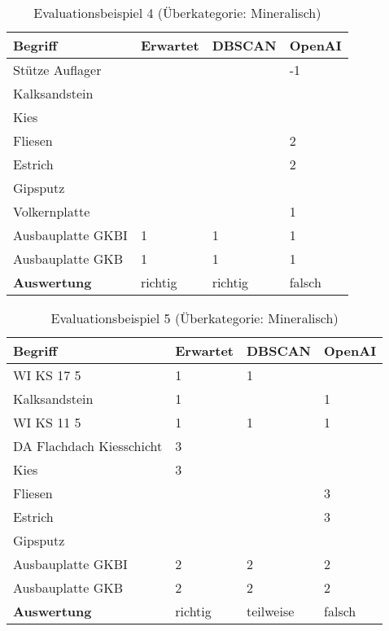 \begin{table}[h]
	
	\centering
	\begin{tabular}{|l|l|l|l|}
		\hline
		\textbf{Begriff} & \textbf{Erwartet} & \textbf{DBSCAN} & \textbf{OpenAI}\\ \hline
		 Stütze Auflager & ~ & ~ & -1 \\ \hline
		Kalksandstein & ~ & ~ & ~ \\ \hline
		Kies & ~ & ~ & ~ \\ \hline
		Fliesen & ~ & ~ & 2 \\ \hline
		Estrich & ~ & ~ & 2 \\ \hline
		Gipsputz & ~ & ~ & ~ \\ \hline
		Volkernplatte & ~ & ~ & 1 \\ \hline
		Ausbauplatte GKBI & 1 & 1 & 1 \\ \hline
		Ausbauplatte GKB & 1 & 1 & 1 \\ \hline
		\textbf{Auswertung} & richtig & richtig & falsch \\ \hline
	\end{tabular}
	\caption{Evaluationsbeispiel 4 (Überkategorie: Mineralisch)}
	\label{t:evaluation-example4}
\end{table}

\begin{table}[h]
	
	\centering
	\begin{tabular}{|l|l|l|l|}
		\hline
		\textbf{Begriff} & \textbf{Erwartet} & \textbf{DBSCAN} & \textbf{OpenAI}\\ \hline
		 WI KS 17 5 & 1 & 1 & ~ \\ \hline
		Kalksandstein & 1 & ~ & 1 \\ \hline
		WI KS 11 5 & 1 & 1 & 1 \\ \hline
		DA Flachdach Kiesschicht & 3 & ~ & ~ \\ \hline
		Kies & 3 & ~ & ~ \\ \hline
		Fliesen & ~ & ~ & 3 \\ \hline
		Estrich & ~ & ~ & 3 \\ \hline
		Gipsputz & ~ & ~ & ~ \\ \hline
		Ausbauplatte GKBI & 2 & 2 & 2 \\ \hline
		Ausbauplatte GKB & 2 & 2 & 2 \\ \hline
		\textbf{Auswertung} & richtig & teilweise & falsch \\ \hline
	\end{tabular}
	\caption{Evaluationsbeispiel 5 (Überkategorie: Mineralisch)}
	\label{t:evaluation-example5}
\end{table}

